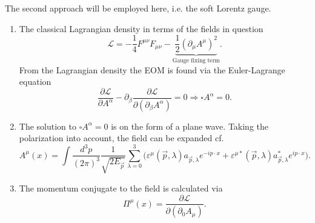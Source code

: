 The second approach will be employed here, i.e. the soft Lorentz gauge.
\begin{enumerate}
	\item The classical Lagrangian density in terms of the fields in question
	\begin{equation}
		\mathcal{L}=-\frac{1}{4}F^{\mu\nu}F_{\mu\nu}-\underbrace{\frac{1}{2}(\partial_\mu A^\mu)^2}_{\text{Gauge fixing term}}.
		\label{lagrange em}
	\end{equation} 
	From the Lagrangian density the EOM is found via the Euler-Lagrange equation
	\begin{equation}
		\frac{\partial \mathcal{L}}{\partial A^{\alpha}}-\partial_\beta\frac{\partial \mathcal{L}}{\partial (\partial_\beta A^\alpha)}=0\Rightarrow \square A^\alpha=0.
	\end{equation} 
	
	\item The solution to $\square A^\alpha=0$ is on the form of a plane wave. Taking the polarization into account, the field can be expanded cf.
	\begin{equation}
		A^\mu(x)=\int\frac{d^3p}{(2\pi)^3}\frac{1}{\sqrt{2E_{\vec{p}}}}\sum_{\lambda=0}^{3}\bigg(\varepsilon^\mu(\vec{p},\lambda)a_{\vec{p},\lambda}e^{-ip\cdot x}+\varepsilon^{\mu*}(\vec{p},\lambda)a_{\vec{p},\lambda}^*e^{ip\cdot x}\bigg).
	\end{equation} 
	
	\item The momentum conjugate to the field is calculated via
	\begin{equation}
		\Pi^\mu(x)=\frac{\partial \mathcal{L}}{\partial (\partial_0 A_\mu)}.
	\end{equation} 
	

\end{enumerate}

